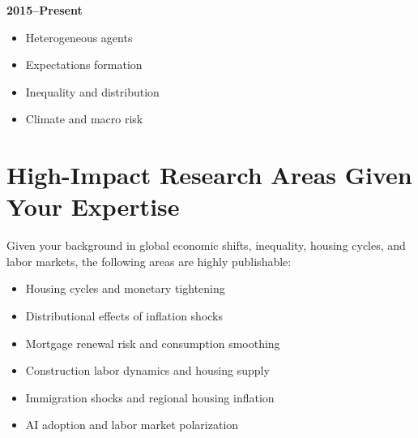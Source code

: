 \documentclass[12pt]{article}
\begin{document}
\textbf{2015--Present}
\begin{itemize}
\item Heterogeneous agents
\item Expectations formation
\item Inequality and distribution
\item Climate and macro risk
\end{itemize}

\section{High-Impact Research Areas Given Your Expertise}

Given your background in global economic shifts, inequality, housing cycles, and labor markets, the following areas are highly publishable:

\begin{itemize}
\item Housing cycles and monetary tightening
\item Distributional effects of inflation shocks
\item Mortgage renewal risk and consumption smoothing
\item Construction labor dynamics and housing supply
\item Immigration shocks and regional housing inflation
\item AI adoption and labor market polarization
\end{itemize}
\end{document}

